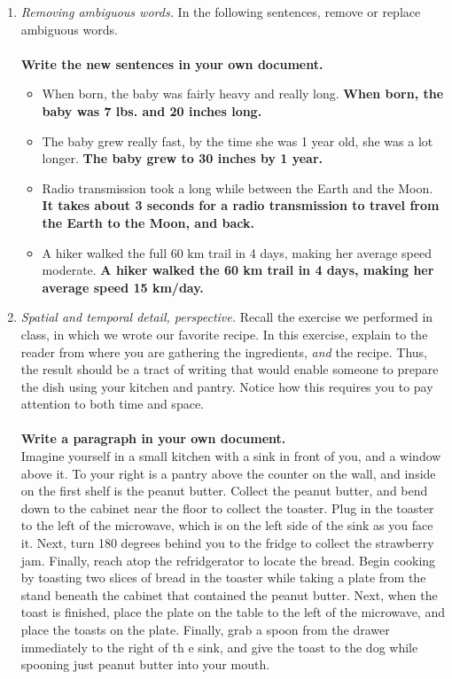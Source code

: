 \documentclass{article}
\begin{document}
\begin{enumerate}
\item \textit{Removing ambiguous words.}  In the following sentences, remove or replace ambiguous words. \\ \\
\textbf{Write the new sentences in your own document.} 
\begin{itemize}
\item When born, the baby was fairly heavy and really long. \textbf{When born, the baby was 7 lbs. and 20 inches long.}
\item The baby grew really fast, by the time she was 1 year old, she was a lot longer. \textbf{The baby grew to 30 inches by 1 year.}
\item Radio transmission took a long while between the Earth and the Moon. \textbf{It takes about 3 seconds for a radio transmission to travel from the Earth to the Moon, and back.}
\item A hiker walked the full 60 km trail in 4 days, making her average speed moderate. \textbf{A hiker walked the 60 km trail in 4 days, making her average speed 15 km/day.}
\end{itemize}
\item \textit{Spatial and temporal detail, perspective.}  Recall the exercise we performed in class, in which we wrote our favorite recipe.  In this exercise, explain to the reader from where you are gathering the ingredients, \textit{and} the recipe.  Thus, the result should be a tract of writing that would enable someone to prepare the dish using your kitchen and pantry. Notice how this requires you to pay attention to both time and space. \\ \\
\textbf{Write a paragraph in your own document.} \\
Imagine yourself in a small kitchen with a sink in front of you, and a window above it.  To your right is a pantry above the counter on the wall, and inside on the first shelf is the peanut butter. Collect the peanut butter, and bend down to the cabinet near the floor to collect the toaster.  Plug in the toaster to the left of the microwave, which is on the left side of the sink as you face it.  Next, turn 180 degrees behind you to the fridge to collect the strawberry jam.  Finally, reach atop the refridgerator to locate the bread.  Begin cooking by toasting two slices of bread in the toaster while taking a plate from the stand beneath the cabinet that contained the peanut butter.  Next, when the toast is finished, place the plate on the table to the left of the microwave, and place the toasts on the plate.  Finally, grab a spoon from the drawer immediately to the right of th e sink, and give the toast to the dog while spooning just peanut butter into your mouth.
\end{enumerate}
\end{document}
